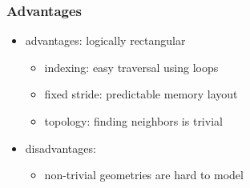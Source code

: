 \begin{frame}[fragile]
%
  \frametitle{Advantages}
%
  \begin{itemize}
%
  \item advantages: logically rectangular
    \begin{itemize}
    \item indexing: easy traversal using loops
    \item fixed stride: predictable memory layout
    \item topology: finding neighbors is trivial
    \end{itemize}
%
    \item disadvantages:
      \begin{itemize}
      \item non-trivial geometries are hard to model
      \end{itemize}
% 
  \end{itemize}
%
\end{frame}


